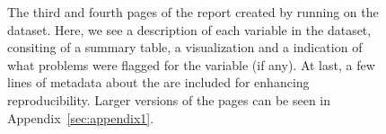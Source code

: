 \documentclass[article,shortnames]{jss}
\begin{document}
\begin{figure}[tb]
\begin{center}
%
\end{center}
\caption{The third and fourth pages of the report created by running  on the 
  dataset. Here, we see a description of each variable in the dataset, consiting of a summary table, a visualization and a indication of what problems were flagged for the variable (if any). At last, a few lines of metadata about the  are included for enhancing reproducibility. Larger versions of the pages can be seen in
  Appendix~\ref{sec:appendix1}.}
\label{fig:example2}
\end{figure}
\end{document}
